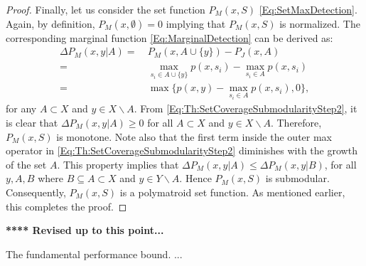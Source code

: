 \documentclass[letterpaper, 10 pt, conference]{ieeeconf}
\begin{document}
\begin{proof}
Finally, let us consider the set function $P_M(x,S)$ \eqref{Eq:SetMaxDetection}. Again, by definition, $P_M(x,\emptyset) = 0$ implying that $P_M(x,S)$ is normalized. The corresponding marginal function \eqref{Eq:MarginalDetection} can be derived as:
\begin{align}
\Delta P_M(x,y \vert A) =&\ P_M(x,A\cup\{y\}) - P_J(x,A) \nonumber\\    
=&\ \max_{s_i\in A\cup\{y\}} p(x,s_i) - \max_{s_i\in A} p(x,s_i)\nonumber\\
=&\ \max\{p(x,y)-\max_{s_i\in A} p(x,s_i),0\}, \label{Eq:Th:SetCoverageSubmodularityStep2}
\end{align}
for any $A \subset X$ and $y\in X\backslash A$. From \eqref{Eq:Th:SetCoverageSubmodularityStep2}, it is clear that $\Delta P_M(x,y \vert A) \geq 0$ for all $A \subset X$ and $y\in X\backslash A$. Therefore, $P_M(x,S)$ is monotone. Note also that the first term inside the outer max operator in \eqref{Eq:Th:SetCoverageSubmodularityStep2} diminishes with the growth of the set $A$. This property implies that $\Delta P_M(x,y \vert A) \leq \Delta P_M(x,y \vert B)$, for all $y,A,B$ where $B \subseteq A \subset X$ and $y \in Y\backslash A$. Hence $P_M(x,S)$ is submodular. Consequently, $P_M(x,S)$ is a polymatroid set function. As mentioned earlier, this completes the proof.
\end{proof}

\bigskip
{\color{blue} \textbf{**** Revised up to this point...} }
\bigskip

{\color{blue} The fundamental performance bound. ...}
\end{document}
